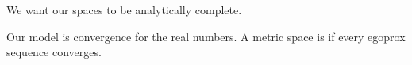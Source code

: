 
\sbasic















\sstart
{}


We want our spaces to be
analytically complete.


Our model is convergence for
the real numbers.
A metric space is 
if every egoprox sequence converges.
\strats
